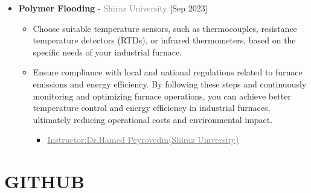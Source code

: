 \documentclass[10pt,a4paper,sans]{moderncv} %
\begin{document}
     	\begin{itemize}
		\item {}  \textbf{Polymer Flooding} - \textcolor{gray}{Shiraz University}    \hfill\textcolor{gray}{}   [Sep 2023]

  \vspace{0.3 em} 
  
  \begin{itemize}
			\item {}  Choose suitable temperature sensors, such as thermocouples, resistance temperature detectors (RTDs), or infrared thermometers, based on the specific needs of your industrial furnace. 

      	    \item {}  Ensure compliance with local and national regulations related to furnace emissions and energy efficiency. By following these steps and continuously monitoring and optimizing furnace operations, you can achieve better temperature control and energy efficiency in industrial furnaces, ultimately reducing operational costs and environmental impact.
			\begin{itemize} 
				\item\href{https://scholar.google.com/citations?hl=en&user=KG__hzQAAAAJ}{\textcolor{gray}{Instructor:Dr.Hamed Peyrovedin(Shiraz University)}}
			\end{itemize}
			

			
		\end{itemize}
	\end{itemize}

 

    \section{GITHUB} 
    
\end{document}
